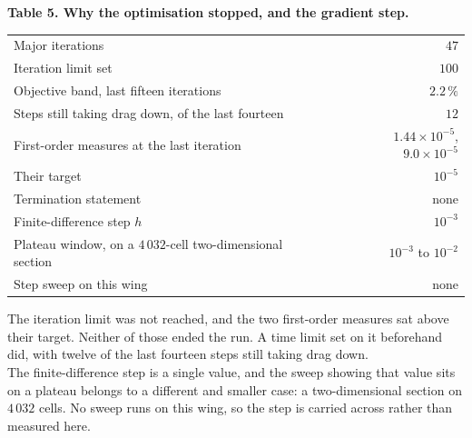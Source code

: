 \documentclass[9pt,a4paper]{article}
\renewcommand{\footnotesize}{\fontsize{6.4}{6.85}\selectfont}
\begin{document}
\begin{minipage}[t]{0.487\textwidth}
\textbf{Table 5. Why the optimisation stopped, and the gradient step.}

\vspace{1.5pt}
{\fontsize{6.7}{7.9}\selectfont
\begin{tabular}{@{}>{\raggedright\arraybackslash}p{52mm} r@{}}
\toprule
& \\
\midrule
Major iterations                  & $47$ \\
Iteration limit set               & $100$ \\
Objective band, last fifteen iterations & $2.2\,\%$ \\
Steps still taking drag down, of the last fourteen & $12$ \\
First-order measures at the last iteration & $1.44\times10^{-5}$, $9.0\times10^{-5}$ \\
Their target                      & $10^{-5}$ \\
Termination statement             & none \\
\midrule
Finite-difference step $h$        & $10^{-3}$ \\
Plateau window, on a $4\,032$-cell two-dimensional section & $10^{-3}$ to $10^{-2}$ \\
Step sweep on this wing           & none \\
\bottomrule
\end{tabular}}
\end{minipage}\hfill
\begin{minipage}[t]{0.487\textwidth}
\vspace{11pt}
{\footnotesize The iteration limit was not reached, and the two first-order
measures sat above their target. Neither of those ended the run. A time limit
set on it beforehand did, with twelve of the last fourteen steps still taking
drag down.\\[3pt]
The finite-difference step is a single value, and the sweep showing that value
sits on a plateau belongs to a different and smaller case: a two-dimensional
section on $4\,032$ cells. No sweep runs on this wing, so the step is carried
across rather than measured here.}
\end{minipage}
\end{document}
